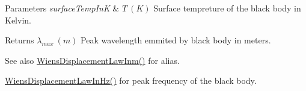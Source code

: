 \begin{DoxyParams}{Parameters}
{\em surface\+Temp\+InK} & $T\ (K)$ Surface tempreture of the black body in Kelvin. \\
\hline
\end{DoxyParams}
\begin{DoxyReturn}{Returns}
$\lambda_{max}\ (m)$ Peak wavelength emmited by black body in meters. 
\end{DoxyReturn}
\begin{DoxySeeAlso}{See also}
\mbox{\hyperlink{group___e_g_x_phys-_electrodynamics-_black_body-_wiens_displacement_law_ga126ebb146c31a2371f1d1d001d11c62f}{Wiens\+Displacement\+Law\+Inm()}} for alias. 

\mbox{\hyperlink{group___e_g_x_phys-_electrodynamics-_black_body-_wiens_displacement_law_gaf09ffbc9b7133c16da786c1609ecf689}{Wiens\+Displacement\+Law\+In\+Hz()}} for peak frequency of the black body. 
\end{DoxySeeAlso}
